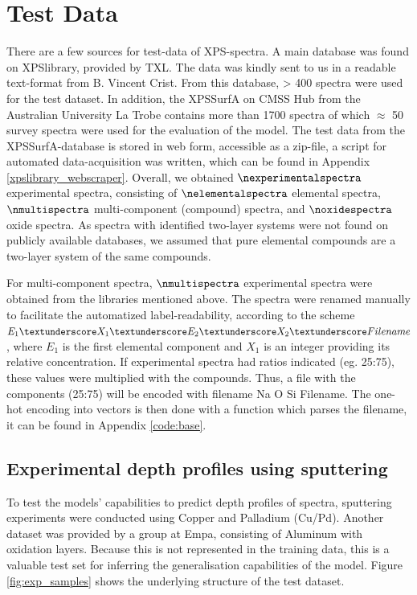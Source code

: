 
\section{Test Data}
\label{test_data}

There are a few sources for test-data of XPS-spectra. A main database was found on XPSlibrary, provided by TXL. The data was kindly sent to us in a readable text-format from B. Vincent Crist. From this database, > 400 spectra were used for the test dataset. In addition, the XPSSurfA on CMSS Hub from the Australian University La Trobe contains more than 1700 spectra of which $\approx$ 50 survey spectra were used for the evaluation of the model. The test data from the XPSSurfA-database is stored in web form, accessible as a zip-file, a script for automated data-acquisition was written, which can be found in Appendix \ref{xpslibrary_webscraper}.
Overall, we obtained $\nexperimentalspectra$ experimental spectra, consisting of $\nelementalspectra$ elemental spectra, $\nmultispectra$  multi-component (compound) spectra, and $\noxidespectra$ oxide spectra.
As spectra with identified two-layer systems were not found on publicly available databases, we assumed that pure elemental compounds are a two-layer system of the same compounds.

For multi-component spectra, $\nmultispectra$ experimental spectra were obtained from the libraries mentioned above. The spectra were renamed manually to facilitate the automatized label-readability, according to the scheme ${E_{1}\textunderscore X_{1} 	\textunderscore E_{2} 	\textunderscore X_{2} 	\textunderscore Filename}$, where $E_{1}$ is the first elemental component and $X_{1}$ is an integer providing its relative concentration. If experimental spectra had ratios indicated (eg. 25:75), these values were multiplied with the compounds. Thus, a file with the components  (25:75) will be encoded with filename Na  \textunderscore O  \textunderscore Si  \textunderscore Filename. The one-hot encoding into vectors is then done with a function which parses the filename, it can be found in Appendix \ref{code:base}.

\subsection{Experimental depth profiles using sputtering}
To test the models' capabilities to predict depth profiles of spectra, sputtering experiments were conducted using Copper and Palladium (Cu/Pd). Another dataset was provided by a group at Empa, consisting of Aluminum with oxidation layers. Because this is not represented in the training data, this is a valuable test set for inferring the generalisation capabilities of the model. Figure \ref{fig:exp_samples} shows the underlying structure of the test dataset.

